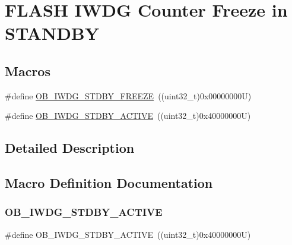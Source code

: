 \hypertarget{group___f_l_a_s_h_ex___option___bytes___i_w_d_g___f_r_e_e_z_e___s_a_n_d_b_y}{}\section{F\+L\+A\+SH I\+W\+DG Counter Freeze in S\+T\+A\+N\+D\+BY}
\label{group___f_l_a_s_h_ex___option___bytes___i_w_d_g___f_r_e_e_z_e___s_a_n_d_b_y}
\subsection*{Macros}
\begin{DoxyCompactItemize}
\item 
\#define \mbox{\hyperlink{group___f_l_a_s_h_ex___option___bytes___i_w_d_g___f_r_e_e_z_e___s_a_n_d_b_y_ga2033b993c192a55757fc3fb0d8cfebc9}{O\+B\+\_\+\+I\+W\+D\+G\+\_\+\+S\+T\+D\+B\+Y\+\_\+\+F\+R\+E\+E\+ZE}}~((uint32\+\_\+t)0x00000000\+U)
\item 
\#define \mbox{\hyperlink{group___f_l_a_s_h_ex___option___bytes___i_w_d_g___f_r_e_e_z_e___s_a_n_d_b_y_gac371d40c19dd808bdcf77c77a07e2944}{O\+B\+\_\+\+I\+W\+D\+G\+\_\+\+S\+T\+D\+B\+Y\+\_\+\+A\+C\+T\+I\+VE}}~((uint32\+\_\+t)0x40000000\+U)
\end{DoxyCompactItemize}


\subsection{Detailed Description}


\subsection{Macro Definition Documentation}
\mbox{\label{group___f_l_a_s_h_ex___option___bytes___i_w_d_g___f_r_e_e_z_e___s_a_n_d_b_y_gac371d40c19dd808bdcf77c77a07e2944}} 
\subsubsection{\texorpdfstring{OB\_IWDG\_STDBY\_ACTIVE}{OB\_IWDG\_STDBY\_ACTIVE}}
{\footnotesize\ttfamily \#define O\+B\+\_\+\+I\+W\+D\+G\+\_\+\+S\+T\+D\+B\+Y\+\_\+\+A\+C\+T\+I\+VE~((uint32\+\_\+t)0x40000000\+U)}

